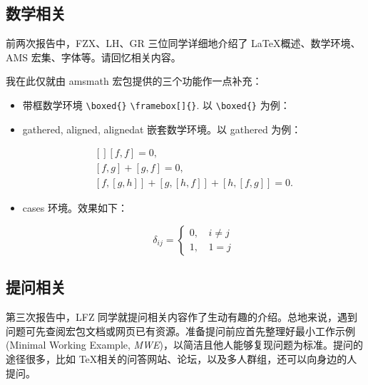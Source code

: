 \subsection{数学相关}
前两次报告中，FZX、LH、GR 三位同学详细地介绍了 \LaTeX 概述、数学环境、AMS 宏集、字体等。请回忆相关内容。

我在此仅就由 amsmath 宏包提供的三个功能作一点补充：
\begin{itemize}
\item 带框数学环境 \verb|\boxed{}| \verb|\framebox[]{}|. 以 \verb|\boxed{}| 为例：
\begin{vertlst}

\boxed{\e^{\iu \theta} = \cos{\theta} + \iu \sin{\theta}}
\end{vertlst}
\item \textsf{gathered}, \textsf{aligned}, \textsf{alignedat} 嵌套数学环境。以 gathered 为例：
\begin{vertlst}

\begin{equation}
\begin{gathered}[]
  [f, f] = 0, \\
  [f, g] + [g, f] = 0, \\
  [f, [g, h]] + [g, [h, f]] + [h, [f, g]] = 0.
\end{gathered}
\end{equation} 
\end{vertlst}
\item cases 环境。效果如下：
\begin{sidelst}
\begin{equation}
  \delta_{ij} =
  \begin{cases}
    0, \, & i \ne j \\
    1, & 1 = j
  \end{cases}
\end{equation}
\end{sidelst}
\end{itemize}


\subsection{提问相关}
第三次报告中，LFZ 同学就提问相关内容作了生动有趣的介绍。总地来说，遇到问题可先查阅宏包文档或网页已有资源。准备提问前应首先整理好最小工作示例 (Minimal Working Example, \emph{MWE})，以简洁且他人能够复现问题为标准。提问的途径很多，比如 \TeX 相关的问答网站、论坛，以及多人群组，还可以向身边的人提问。

